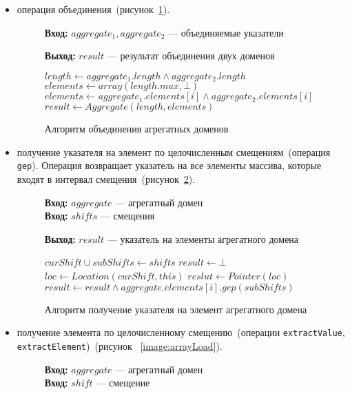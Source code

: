 \begin{itemize}
\item операция объединения~(рисунок~\ref{image:arrayJoin}).
\begin{figure}[h!]
\textbf{Вход:} $aggregate_1, aggregate_2$ --- объединяемые указатели

\textbf{Выход:} $result$ --- результат объединения двух доменов

\begin{algorithmic}[1]
\State $length \gets aggregate_1.length \wedge aggregate_2.length$
\State $elements \gets array(length.max, \bot)$
    \State $elements \gets aggregate_1.elements[i] \wedge
    aggregate_2.elements[i]$
\EndFor
\State $result \gets Aggregate(length, elements)$
\end{algorithmic}
\caption{Алгоритм объединения агрегатных доменов}
\label{image:arrayJoin}
\end{figure}

\item получение указателя на элемент по целочисленным смещениям~(операция 
\texttt{gep}). Операция возвращает указатель на все элементы массива, которые
входят в интервал смещения~(рисунок~\ref{image:arrayGep}).
\begin{figure}[h!]
\textbf{Вход:} $aggregate$ --- агрегатный домен\\
\textbf{Вход:} $shifts$ --- смещения

\textbf{Выход:} $result$ --- указатель на элементы агрегатного домена

\begin{algorithmic}[1]
\State $curShift \cup subShifts \gets shifts$
\State $result \gets \bot$
    \State $loc \gets Location({curShift}, this)$
    \State $reslut \gets Pointer({loc})$
\Else
        \State $result \gets result \wedge 
        aggregate.elements[i].gep(subShifts)$
    \EndFor
\EndIf
\end{algorithmic}
\caption{Алгоритм получение указателя на элемент агрегатного домена}
\label{image:arrayGep}
\end{figure}

\item получение элемента по целочисленному смещению~(операции 
\texttt{extractValue}, \texttt{extractElement})~(рисунок~
\ref{image:arrayLoad}).
\begin{figure}[h!]
\textbf{Вход:} $aggregate$ --- агрегатный домен\\
\textbf{Вход:} $shift$ --- смещение


\end{figure}
\end{itemize}
